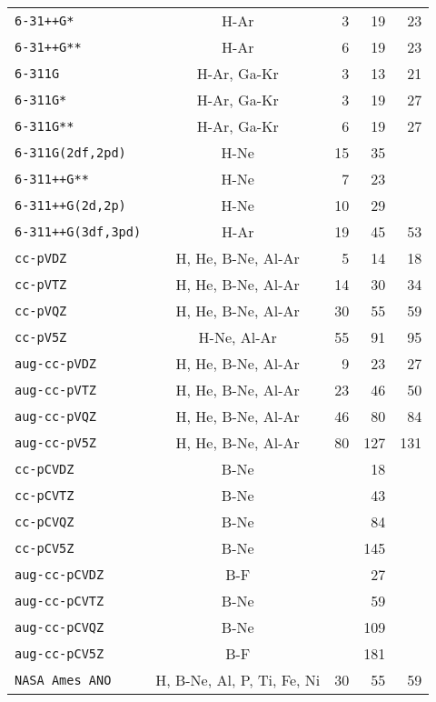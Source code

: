 \begin{latexonly}
\begin{longtable}{lcrrr}
\verb*|6-31++G*| & H-Ar & 3 & 19 & 23 \\
\verb*|6-31++G**| & H-Ar & 6 & 19 & 23 \\
\verb*|6-311G| & H-Ar, Ga-Kr & 3 & 13 & 21 \\
\verb*|6-311G*| & H-Ar, Ga-Kr & 3 & 19 & 27 \\
\verb*|6-311G**| & H-Ar, Ga-Kr & 6 & 19 & 27 \\
\verb*|6-311G(2df,2pd)| & H-Ne & 15 & 35 &  \\
\verb*|6-311++G**| & H-Ne & 7 & 23 &  \\
\verb*|6-311++G(2d,2p)| & H-Ne & 10 & 29 &  \\
\verb*|6-311++G(3df,3pd)| & H-Ar & 19 & 45 & 53 \\
\verb*|cc-pVDZ| & H, He, B-Ne, Al-Ar & 5 & 14 & 18 \\
\verb*|cc-pVTZ| & H, He, B-Ne, Al-Ar & 14 & 30 & 34 \\
\verb*|cc-pVQZ| & H, He, B-Ne, Al-Ar & 30 & 55 & 59 \\
\verb*|cc-pV5Z| & H-Ne, Al-Ar & 55 & 91 & 95 \\
\verb*|aug-cc-pVDZ| & H, He, B-Ne, Al-Ar & 9 & 23 & 27 \\
\verb*|aug-cc-pVTZ| & H, He, B-Ne, Al-Ar & 23 & 46 & 50 \\
\verb*|aug-cc-pVQZ| & H, He, B-Ne, Al-Ar & 46 & 80 & 84 \\
\verb*|aug-cc-pV5Z| & H, He, B-Ne, Al-Ar & 80 & 127 & 131 \\
\verb*|cc-pCVDZ| & B-Ne &  & 18 &  \\
\verb*|cc-pCVTZ| & B-Ne &  & 43 &  \\
\verb*|cc-pCVQZ| & B-Ne &  & 84 &  \\
\verb*|cc-pCV5Z| & B-Ne &  & 145 &  \\
\verb*|aug-cc-pCVDZ| & B-F &  & 27 &  \\
\verb*|aug-cc-pCVTZ| & B-Ne &  & 59 &  \\
\verb*|aug-cc-pCVQZ| & B-Ne &  & 109 &  \\
\verb*|aug-cc-pCV5Z| & B-F &  & 181 &  \\
\verb*|NASA Ames ANO| & H, B-Ne, Al, P, Ti, Fe, Ni & 30 & 55 & 59 \\
\end{longtable}
\end{latexonly}

